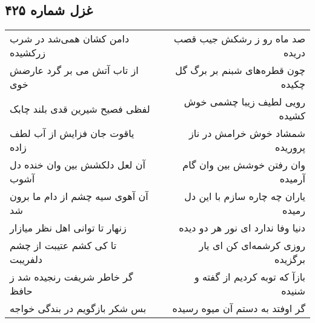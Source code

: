 \begin{center}
\section*{غزل شماره ۴۲۵}
\label{sec:sh425}
\begin{longtable}{l p{0.5cm} r}
دامن کشان همی‌شد در شرب زرکشیده
&&
صد ماه رو ز رشکش جیب قصب دریده
\\
از تاب آتش می بر گرد عارضش خوی
&&
چون قطره‌های شبنم بر برگ گل چکیده
\\
لفظی فصیح شیرین قدی بلند چابک
&&
رویی لطیف زیبا چشمی خوش کشیده
\\
یاقوت جان فزایش از آب لطف زاده
&&
شمشاد خوش خرامش در ناز پروریده
\\
آن لعل دلکشش بین وان خنده دل آشوب
&&
وان رفتن خوشش بین وان گام آرمیده
\\
آن آهوی سیه چشم از دام ما برون شد
&&
یاران چه چاره سازم با این دل رمیده
\\
زنهار تا توانی اهل نظر میازار
&&
دنیا وفا ندارد ای نور هر دو دیده
\\
تا کی کشم عتیبت از چشم دلفریبت
&&
روزی کرشمه‌ای کن ای یار برگزیده
\\
گر خاطر شریفت رنجیده شد ز حافظ
&&
بازآ که توبه کردیم از گفته و شنیده
\\
بس شکر بازگویم در بندگی خواجه
&&
گر اوفتد به دستم آن میوه رسیده
\\
\end{longtable}
\end{center}
